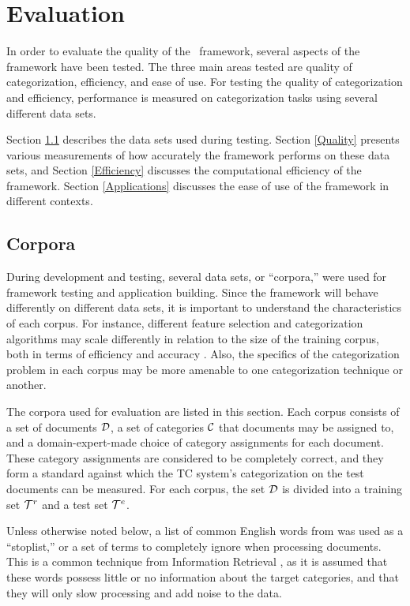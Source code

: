 \chapter{Evaluation}
\label{Evaluation}

In order to evaluate the quality of the \aicat\ framework, several
aspects of the framework have been tested.  The three main areas
tested are quality of categorization, efficiency, and ease of use.
For testing the quality of categorization and efficiency, performance
is measured on categorization tasks using several different data sets.

Section \ref{Corpora} describes the data sets used during testing.
Section \ref{Quality} presents various measurements of how accurately
the framework performs on these data sets, and Section
\ref{Efficiency} discusses the computational efficiency of the
framework.  Section \ref{Applications} discusses the ease of use of
the framework in different contexts.


\section{Corpora}
\label{Corpora}

During development and testing, several data sets, or ``corpora,''
were used for framework testing and application building.  Since the
framework will behave differently on different data sets, it is
important to understand the characteristics of each corpus.  For
instance, different feature selection and categorization algorithms
may scale differently in relation to the size of the training corpus,
both in terms of efficiency and accuracy \cite{chakrabarti:98}. Also,
the specifics of the categorization problem in each corpus may be more
amenable to one categorization technique or another.

The corpora used for evaluation are listed in this section.  Each
corpus consists of a set of documents $\mathcal{D}$, a set of categories $\mathcal{C}$ that
documents may be assigned to, and a domain-expert-made choice of
category assignments for each document.  These category assignments
are considered to be completely correct, and they form a standard
against which the TC system's categorization on the test documents can
be measured.  For each corpus, the set $\mathcal{D}$ is divided into a
training set $\mathcal{T}^r$ and a test set $\mathcal{T}^e$.

Unless otherwise noted below, a list of common English words from
\cite{salton:89} was used as a ``stoplist,'' or a set of terms to
completely ignore when processing documents.  This is a common technique from
Information Retrieval \cite[sec. 15.1.1]{manning:99}, as it is assumed that these words
possess little or no information about the target categories, and that
they will only slow processing and add noise to the data.


